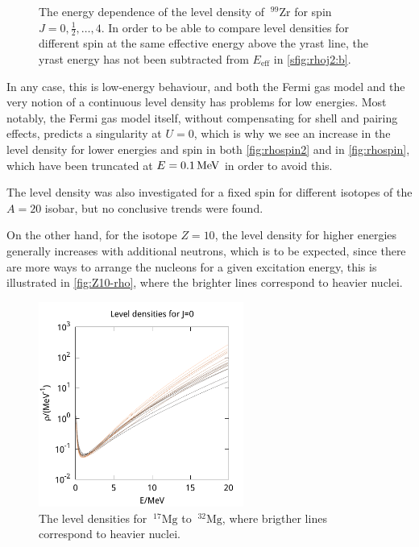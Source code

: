 \begin{figure}
\begin{center}
\begin{tabular}{cc}
\end{tabular}
\caption{\label{fig:rhospin2} The energy dependence of the level density of $~^{99}\mathrm{Zr}$ for spin $J=0,\tfrac{1}{2},\dots, 4$. In order to be able to compare level densities for different spin at the same effective energy above the yrast line, the yrast energy has not been subtracted from $E_\text{eff}$ in \ref{sfig:rhoj2:b}.}
\end{center}
\end{figure}

In any case, this is low-energy behaviour, and both the Fermi gas model\cite{grossjean1985} and the very notion of a continuous level density has problems for low energies. Most notably, the Fermi gas model itself, without compensating for shell and pairing effects, predicts a singularity at $U=0$, which is why we see an increase in the level density for lower energies and spin in both \autoref{fig:rhospin2} and in \autoref{fig:rhospin}, which have been truncated at $E=\unit[0.1]{MeV}$ in order to avoid this.

The level density was also investigated for a fixed spin for different isotopes of the $A=20$ isobar, but no conclusive trends were found.

On the other hand, for the isotope $Z=10$, the level density for higher energies generally increases with additional neutrons, which is to be expected, since there are more ways to arrange the nucleons for a given excitation energy, this is illustrated in \autoref{fig:Z10-rho}, where the brighter lines correspond to heavier nuclei.

\begin{figure}
\begin{center}
\includegraphics[width=0.6\textwidth]{figures/rho/Z10_N7-N22.pdf}
\caption{\label{fig:Z10-rho} The level densities for $~^{17}\mathrm{Mg}$ to $~^{32}\mathrm{Mg}$, where brigther lines correspond to heavier nuclei.}
\end{center}
\end{figure}

